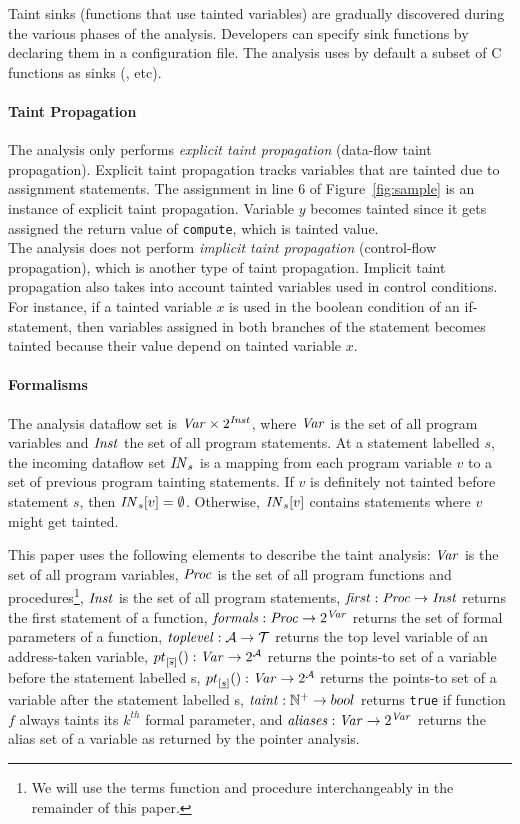 Taint sinks (functions that use tainted variables) are gradually
discovered during the various phases of the analysis. Developers
can specify sink functions by declaring them in a configuration
file. The analysis uses by default a subset of C functions as
sinks ({\tt  }, etc).

\paragraph{Taint Propagation}
The analysis only performs \textit{explicit taint propagation}
(data-flow taint propagation). Explicit taint propagation tracks variables
that are tainted due to assignment statements. The assignment in line $6$
of Figure~\ref{fig:sample} is an instance of explicit taint propagation.
Variable $y$ becomes tainted since it gets assigned the return value of
\texttt{compute}, which is tainted value.\\
The analysis does not perform \textit{implicit taint propagation}
(control-flow propagation), which is another type of taint propagation.
Implicit taint propagation also takes into account tainted variables
used in control conditions. For instance, if a tainted variable $x$ is
used in the boolean condition of an if-statement, then variables
assigned in both branches of the statement becomes tainted because
their value depend on tainted variable $x$.

\paragraph{Formalisms}
The analysis dataflow set is $\mathit{Var} \times 2^\mathit{Inst}$,
where $\mathit{Var}$ is the set of all program variables and
$\mathit{Inst}$ the set of all program statements. 
At a statement labelled $s$, the incoming dataflow set $\mathit{IN}_s$
is a mapping from each program variable $v$ to a set of
previous program tainting statements.
If $v$ is definitely not tainted before statement $s$, then
$\mathit{IN}_s[v] = \emptyset$. Otherwise, $\mathit{IN}_s[v]$
contains statements where $v$ might get tainted.

This paper uses the following elements to describe the
taint analysis:
$\mathit{Var}$ is the set of all program variables,
$\mathit{Proc}$ is the set of all program functions and procedures\footnote{We
will use the terms function and procedure interchangeably in
the remainder of this paper.},
$\mathit{Inst}$ is the set of all program statements,
$\mathit{first}{}: \mathit{Proc} \rightarrow \mathit{Inst}$ returns the first
statement of a function,
$\mathit{formals}{}: \mathit{Proc} \rightarrow 2^{\mathit{Var}}$ returns the
set of formal parameters of a function, 
$\mathit{toplevel}{}: \mathcal{A} \rightarrow \mathcal{T}$ returns the top level
variable of an address-taken variable,
${pt}_{[\overline{s}] }(): \mathit{Var} \rightarrow 2^\mathcal{A}$ returns the
points-to set of a variable before the statement labelled s, 
${pt}_{[\underline{s}]}(): \mathit{Var} \rightarrow 2^\mathcal{A}$ returns the
points-to set of a variable after the statement labelled s,
$\mathit{taint}: \mathbb{N}^+ \rightarrow bool$ returns \texttt{true}
if function $f$ always taints its $k^{th}$ formal parameter, and
$\mathit{aliases}: \mathit{Var} \rightarrow 2^\mathit{Var}$ returns the alias set of
a variable as returned by the pointer analysis.

